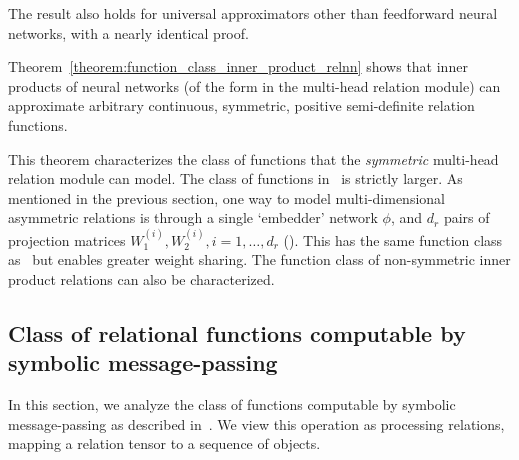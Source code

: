 \begin{remark}
	The result also holds for universal approximators other than feedforward neural networks, with a nearly identical proof.
\end{remark}

Theorem~\ref{theorem:function_class_inner_product_relnn} shows that inner products of neural networks (of the form in the multi-head relation module) can approximate arbitrary continuous, symmetric, positive semi-definite relation functions.

This theorem characterizes the class of functions that the \textit{symmetric} multi-head relation module can model. The class of functions in~ is strictly larger. As mentioned in the previous section, one way to model multi-dimensional asymmetric relations is through a single `embedder' network $\phi$, and $d_r$ pairs of projection matrices $W_1^{(i)}, W_2^{(i)}, i = 1, \ldots, d_r$ (). This has the same function class as~ but enables greater weight sharing. The function class of non-symmetric inner product relations can also be characterized.

\subsection{Class of relational functions computable by symbolic message-passing}\label{ssec:function_class_symbolic_mp}

In this section, we analyze the class of functions computable by symbolic message-passing as described in~. We view this operation as processing relations, mapping a relation tensor to a sequence of objects.

